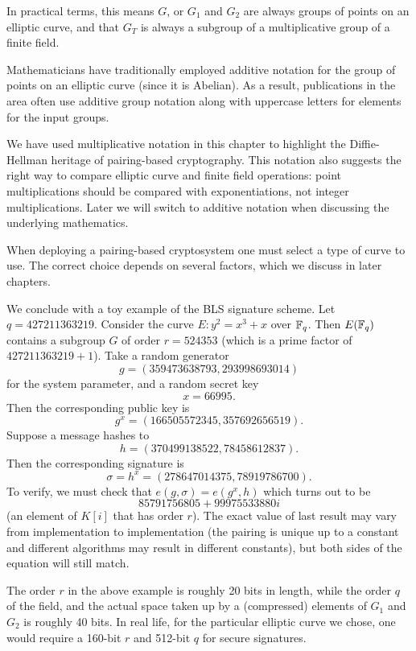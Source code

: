 In practical terms, this means $G$, or $G_1$ and $G_2$ are always
groups of points on
an elliptic curve, and that $G_T$ is always a subgroup of a multiplicative group
of a finite field.

Mathematicians have traditionally employed additive notation for the
group of points on an elliptic curve (since it is
Abelian). As a result, publications in the area often use additive group
notation along with uppercase letters for elements for the input groups.

We have used multiplicative notation in this chapter to highlight the
Diffie-Hellman heritage of pairing-based cryptography. This notation also
suggests the right way to compare elliptic curve and finite field operations:
point multiplications should be compared with exponentiations, not
integer multiplications. Later we will switch to additive notation when
discussing the underlying mathematics.

When deploying a pairing-based cryptosystem one must select a type of
curve to use. The correct choice depends on several factors,
which we discuss in later chapters.

We conclude with a toy example of the BLS signature scheme.
Let $q = 427211363219$.
Consider the curve $E : y^2 = x^3 + x$ over
$\mathbb{F}_q$. Then $E(\mathbb{F}_q)$ contains a subgroup
$G$ of order $r = 524353$ (which is a prime factor of $427211363219 + 1$).
Take a random generator
\[ g = (359473638793, 293998693014) \]
for the system parameter, and a random secret key
\[ x = 66995 . \]
Then the corresponding public key is
\[ g^x = (166505572345, 357692656519) . \]
Suppose a message hashes to
\[ h = (370499138522, 78458612837) . \]
Then the corresponding signature is
\[ \sigma = h^x = (278647014375, 78919786700) . \]
To verify, we must check that $e(g, \sigma) = e(g^x , h)$
which turns out to be
\[ 85791756805 + 99975533880i \]
(an element of $K[i]$ that has order $r$).
The exact value of last result may vary
from implementation to implementation (the pairing is unique up to a
constant and different algorithms may result in different constants),
but both sides of the equation will still match.

The order $r$ in the above example is roughly 20 bits in length,
while the order $q$ of the field, and the actual space taken up by
a (compressed) elements of $G_1$ and $G_2$ is roughly 40 bits. In real life,
for the particular elliptic curve we chose,
one would require a 160-bit $r$ and 512-bit $q$
for secure signatures.
